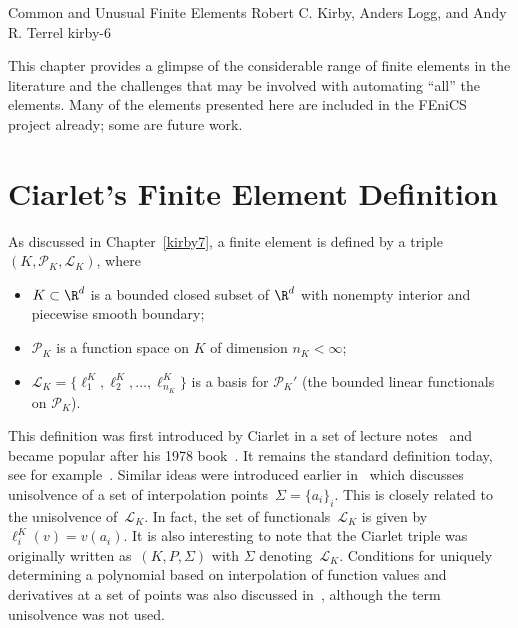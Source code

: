               {Common and Unusual Finite Elements}
              {Robert C. Kirby, Anders Logg, and Andy R. Terrel}
              {kirby-6}

\newcommand{\elemententry}[1]{\null

\texttt{[image: \#1]}}

This chapter provides a glimpse of the considerable range of finite
elements in the literature and the challenges that may be involved
with automating ``all'' the elements. Many of the elements presented
here are included in the FEniCS project already; some are future work.

\section{Ciarlet's Finite Element Definition}

As discussed in Chapter~\ref{kirby7}, a finite element is defined by a
triple $(K, \mathcal{P}_K, \mathcal{L}_K)$, where
\begin{itemize}
\item
  $K \subset \R^d$ is a bounded closed subset of $\R^d$ with nonempty
  interior and piecewise smooth boundary;
\item
  $\mathcal{P}_K$ is a function space on $K$ of dimension $n_K < \infty$;
\item
  $\mathcal{L}_K = \{\ell^K_1, \ell^K_2, \ldots, \ell^K_{n_K}\}$ is a
  basis for $\mathcal{P}_K'$ (the bounded linear functionals on
  $\mathcal{P}_K$).
\end{itemize}

This definition was first introduced by Ciarlet in a set of lecture
notes~\cite{Ciarlet1975} and became popular after his 1978
book~\cite{Ciarlet1978,Ciarlet2002}. It remains the standard
definition today, see for example~\cite{BrennerScott2008}. Similar
ideas were introduced earlier in~\cite{CiarletRaviart1972} which
discusses unisolvence of a set of interpolation points~$\Sigma =
\{a_i\}_i$. This is closely related to the unisolvence of~$\mathcal{L}_K$. In fact, the set of
functionals~$\mathcal{L}_K$ is given by $\ell^K_i(v) = v(a_i)$. It is
also interesting to note that the Ciarlet triple was originally
written as~$(K,P,\Sigma)$ with $\Sigma$
denoting~$\mathcal{L}_K$. Conditions for uniquely determining a
polynomial based on interpolation of function values and derivatives
at a set of points was also discussed in~\cite{BrambleZlamal1970},
although the term unisolvence was not used.

